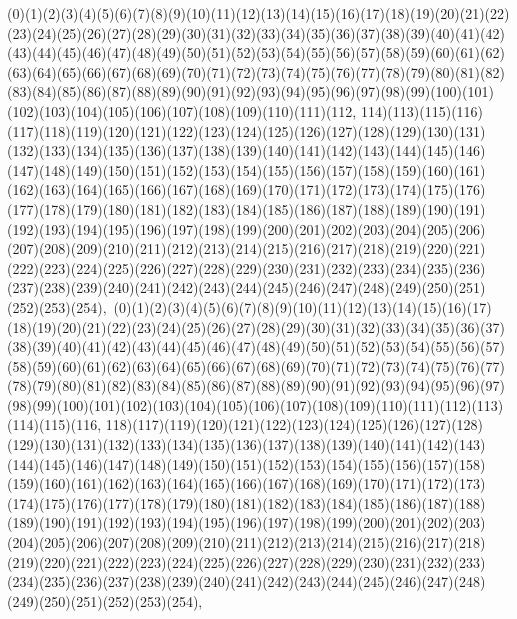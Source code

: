 \documentclass[12pt]{article}
\begin{document}
{(0)(1)(2)(3)(4)(5)(6)(7)(8)(9)(10)(11)(12)(13)(14)(15)(16)(17)(18)(19)(20)(21)(22)(23)(24)(25)(26)(27)(28)(29)(30)(31)(32)(33)(34)(35)(36)(37)(38)(39)(40)(41)(42)(43)(44)(45)(46)(47)(48)(49)(50)(51)(52)(53)(54)(55)(56)(57)(58)(59)(60)(61)(62)(63)(64)(65)(66)(67)(68)(69)(70)(71)(72)(73)(74)(75)(76)(77)(78)(79)(80)(81)(82)(83)(84)(85)(86)(87)(88)(89)(90)(91)(92)(93)(94)(95)(96)(97)(98)(99)(100)(101)(102)(103)(104)(105)(106)(107)(108)(109)(110)(111)(112, 114)(113)(115)(116)(117)(118)(119)(120)(121)(122)(123)(124)(125)(126)(127)(128)(129)(130)(131)(132)(133)(134)(135)(136)(137)(138)(139)(140)(141)(142)(143)(144)(145)(146)(147)(148)(149)(150)(151)(152)(153)(154)(155)(156)(157)(158)(159)(160)(161)(162)(163)(164)(165)(166)(167)(168)(169)(170)(171)(172)(173)(174)(175)(176)(177)(178)(179)(180)(181)(182)(183)(184)(185)(186)(187)(188)(189)(190)(191)(192)(193)(194)(195)(196)(197)(198)(199)(200)(201)(202)(203)(204)(205)(206)(207)(208)(209)(210)(211)(212)(213)(214)(215)(216)(217)(218)(219)(220)(221)(222)(223)(224)(225)(226)(227)(228)(229)(230)(231)(232)(233)(234)(235)(236)(237)(238)(239)(240)(241)(242)(243)(244)(245)(246)(247)(248)(249)(250)(251)(252)(253)(254)$
, 
$
(0)(1)(2)(3)(4)(5)(6)(7)(8)(9)(10)(11)(12)(13)(14)(15)(16)(17)(18)(19)(20)(21)(22)(23)(24)(25)(26)(27)(28)(29)(30)(31)(32)(33)(34)(35)(36)(37)(38)(39)(40)(41)(42)(43)(44)(45)(46)(47)(48)(49)(50)(51)(52)(53)(54)(55)(56)(57)(58)(59)(60)(61)(62)(63)(64)(65)(66)(67)(68)(69)(70)(71)(72)(73)(74)(75)(76)(77)(78)(79)(80)(81)(82)(83)(84)(85)(86)(87)(88)(89)(90)(91)(92)(93)(94)(95)(96)(97)(98)(99)(100)(101)(102)(103)(104)(105)(106)(107)(108)(109)(110)(111)(112)(113)(114)(115)(116, 118)(117)(119)(120)(121)(122)(123)(124)(125)(126)(127)(128)(129)(130)(131)(132)(133)(134)(135)(136)(137)(138)(139)(140)(141)(142)(143)(144)(145)(146)(147)(148)(149)(150)(151)(152)(153)(154)(155)(156)(157)(158)(159)(160)(161)(162)(163)(164)(165)(166)(167)(168)(169)(170)(171)(172)(173)(174)(175)(176)(177)(178)(179)(180)(181)(182)(183)(184)(185)(186)(187)(188)(189)(190)(191)(192)(193)(194)(195)(196)(197)(198)(199)(200)(201)(202)(203)(204)(205)(206)(207)(208)(209)(210)(211)(212)(213)(214)(215)(216)(217)(218)(219)(220)(221)(222)(223)(224)(225)(226)(227)(228)(229)(230)(231)(232)(233)(234)(235)(236)(237)(238)(239)(240)(241)(242)(243)(244)(245)(246)(247)(248)(249)(250)(251)(252)(253)(254)$
, 
$
}
\end{document}

